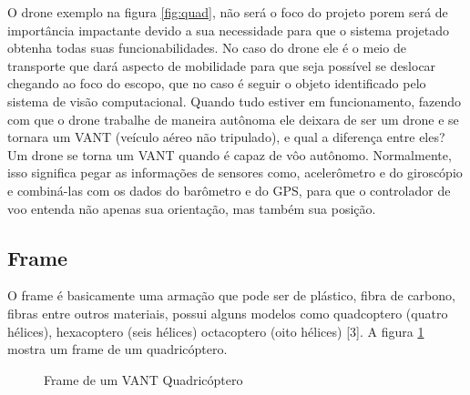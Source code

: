 O drone exemplo na figura \ref{fig:quad}, não será o foco do projeto porem será de importância impactante devido a sua necessidade para que o sistema projetado obtenha todas suas funcionabilidades. No caso do drone ele é o meio de transporte que dará aspecto de mobilidade para que seja possível se deslocar chegando ao foco do escopo, que no caso é seguir o objeto identificado pelo sistema de visão computacional.
Quando tudo estiver em funcionamento, fazendo com que o drone trabalhe de maneira autônoma ele deixara de ser um drone e se tornara um VANT (veículo aéreo não tripulado), e qual a diferença entre eles? Um drone se torna um VANT quando é capaz de vôo autônomo. Normalmente, isso significa pegar as informações de sensores como, acelerômetro e do giroscópio e combiná-las com os dados do barômetro e do GPS, para que o controlador de voo entenda não apenas sua orientação, mas também sua posição.

\subsection{Frame}
O frame é basicamente uma armação que pode ser de plástico, fibra de carbono, fibras entre outros materiais, possui alguns modelos como quadcoptero (quatro hélices), hexacoptero (seis hélices) octacoptero (oito hélices) [3]. A figura \ref{fig:frame} mostra um frame de um quadricóptero.

\begin{figure}[H]
	\centering
	\caption{Frame de um VANT Quadricóptero}
	\fontsize{9pt}{12pt}\selectfont
	\def\svgwidth{13cm}
	
	\label{fig:frame}
\end{figure}

